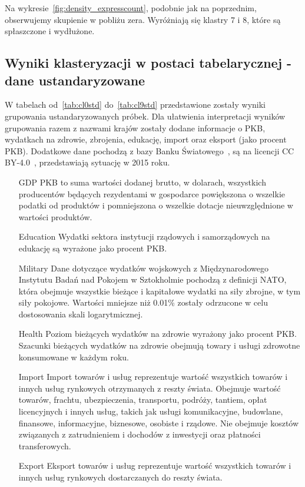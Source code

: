 \documentclass[11pt]{report}
\begin{document}
    Na wykresie~\ref{fig:density_expresscount}, podobnie jak na poprzednim, obserwujemy skupienie w pobliżu zera.
    Wyróżniają się klastry 7 i 8, które są spłaszczone i wydłużone.

    \subsection{Wyniki klasteryzacji w postaci tabelarycznej - dane ustandaryzowane}
    W tabelach od~\ref{tab:cl0std} do~\ref{tab:cl9std} przedstawione zostały wyniki grupowania ustandaryzowanych próbek.
    Dla ułatwienia interpretacji wyników grupowania razem z nazwami krajów zostały dodane informacje o PKB, wydatkach na zdrowie, zbrojenia, edukację, import oraz eksport (jako procent PKB).
    Dodatkowe dane pochodzą z bazy Banku Światowego~\cite{worldbank}, są na licencji CC BY-4.0~\cite{wblicense}, przedstawiają sytuację w 2015 roku.
    \begin{enumerate}
        \item[GDP] PKB to suma wartości dodanej brutto, w dolarach, wszystkich producentów będących rezydentami w gospodarce powiększona o wszelkie podatki od produktów i pomniejszona o wszelkie dotacje nieuwzględnione w wartości produktów.
        \item[Education] Wydatki sektora instytucji rządowych i samorządowych na edukację są wyrażone jako procent PKB.
        \item[Military] Dane dotyczące wydatków wojskowych z Międzynarodowego Instytutu Badań nad Pokojem w Sztokholmie pochodzą z definicji NATO, która obejmuje wszystkie bieżące i kapitałowe wydatki na siły zbrojne, w tym siły pokojowe.
        Wartości mniejsze niż 0.01\% zostały odrzucone w celu dostosowania skali logarytmicznej.
        \item[Health] Poziom bieżących wydatków na zdrowie wyrażony jako procent PKB. Szacunki bieżących wydatków na zdrowie obejmują towary i usługi zdrowotne konsumowane w każdym roku.
        \item[Import] Import towarów i usług reprezentuje wartość wszystkich towarów i innych usług rynkowych otrzymanych z reszty świata.
        Obejmuje wartość towarów, frachtu, ubezpieczenia, transportu, podróży, tantiem, opłat licencyjnych i innych usług, takich jak usługi komunikacyjne, budowlane, finansowe, informacyjne, biznesowe, osobiste i rządowe.
        Nie obejmuje kosztów związanych z zatrudnieniem i dochodów z inwestycji oraz płatności transferowych.
        \item[Export] Eksport towarów i usług reprezentuje wartość wszystkich towarów i innych usług rynkowych dostarczanych do reszty świata.
    \end{enumerate}
\end{document}
